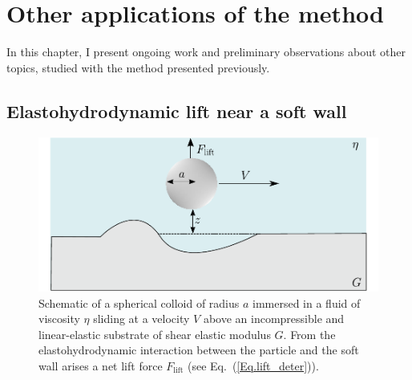 
\section{Other applications of the method}
\label{chapfin}
In this chapter, I present ongoing work and preliminary observations about other topics, studied with the method presented previously.

\subsection{Elastohydrodynamic lift near a soft wall}

\begin{figure}[H]
	\centering
	\includegraphics{02_body/chapter4/images/EHD_forces/drawing_system.pdf}
	\caption{Schematic of a spherical colloid of radius $a$  immersed in a fluid of viscosity $\eta$ sliding at a velocity $V$ above an incompressible and linear-elastic substrate of shear elastic modulus $G$. From the elastohydrodynamic interaction between the particle and the soft wall arises a net lift force $F_\mathrm{lift}$ (see Eq.~(\ref{Eq.lift_deter})).}
	\label{fig.shema_EHD}
\end{figure}



